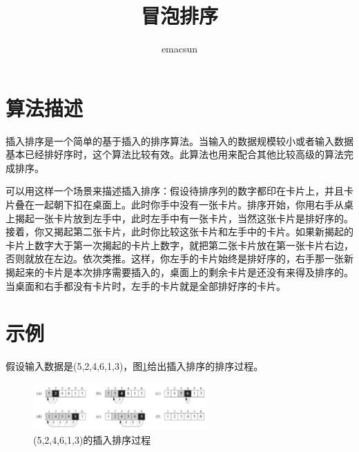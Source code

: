 \documentclass[10pt,a4paper,UTF8]{article}
\author{emacsun}
\date{}
\title{冒泡排序}
\begin{document}
\maketitle
\tableofcontents
{}

\section{算法描述}
\label{sec:org9fbaaa9}


插入排序是一个简单的基于插入的排序算法。当输入的数据规模较小或者输入数据基本已经排好序时，这个算法比较有效。此算法也用来配合其他比较高级的算法完成排序。

可以用这样一个场景来描述插入排序：假设待排序列的数字都印在卡片上，并且卡片叠在一起朝下扣在桌面上。此时你手中没有一张卡片。排序开始，你用右手从桌上揭起一张卡片放到左手中，此时左手中有一张卡片，当然这张卡片是排好序的。接着，你又揭起第二张卡片，此时你比较这张卡片和左手中的卡片。如果新揭起的卡片上数字大于第一次揭起的卡片上数字，就把第二张卡片放在第一张卡片右边，否则就放在左边。依次类推。这样，你左手的卡片始终是排好序的，右手那一张新揭起来的卡片是本次排序需要插入的，桌面上的剩余卡片是还没有来得及排序的。当桌面和右手都没有卡片时，左手的卡片就是全部排好序的卡片。

\section{示例}
\label{sec:org23f3851}


假设输入数据是(5,2,4,6,1,3)，图\ref{fig:org1809d32}给出插入排序的排序过程。
\begin{figure}[htbp]
\centering
\includegraphics[width=0.6\textwidth]{../../img/computer_algorithms/20170702insertionSort.png}
\caption{\label{fig:org1809d32}
(5,2,4,6,1,3)的插入排序过程}
\end{figure}
\end{document}
